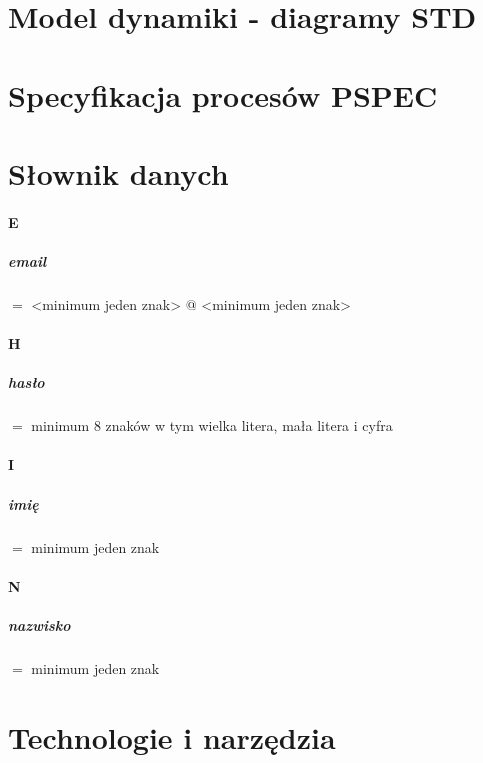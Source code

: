 \documentclass[12pt]{report}
\begin{document}
	
	\chapter{Model dynamiki - diagramy STD}
	
	\chapter{Specyfikacja procesów PSPEC}
	
	
	\chapter{Słownik danych}
	
	\subsubsection{E}
\paragraph{email} $=$ <minimum jeden znak> @ <minimum jeden znak> 
\subsubsection{H}
\paragraph{hasło} $=$ minimum 8 znaków w tym wielka litera, mała litera i cyfra 
\subsubsection{I}
\paragraph{imię}  $=$ minimum jeden znak  
\subsubsection{N}
\paragraph{nazwisko} $=$ minimum jeden znak 


	\chapter{Technologie i narzędzia}	
\end{document}
